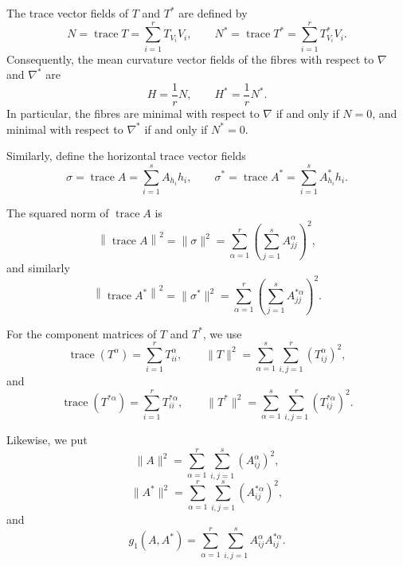 \documentclass[10pt,a4paper]{article}
\theoremstyle{definition}
\theoremstyle{remark}
\numberwithin{equation}{section}
\begin{document}
The trace vector fields of $T$ and $T^{*}$ are defined by
\begin{equation}
N=\operatorname{trace}T
=
\sum_{i=1}^{r}T_{V_i}V_i,
\qquad
N^{*}=\operatorname{trace}T^{*}
=
\sum_{i=1}^{r}T^{*}_{V_i}V_i.
\label{eq-trace-T}
\end{equation}
Consequently, the mean curvature vector fields of the fibres with respect
to $\nabla$ and $\nabla^{*}$ are
\begin{equation}
H=\frac{1}{r}N,
\qquad
H^{*}=\frac{1}{r}N^{*}.
\label{eq-mean-curvature}
\end{equation}
In particular, the fibres are minimal with respect to $\nabla$ if and
only if $N=0$, and minimal with respect to $\nabla^{*}$ if and only if
$N^{*}=0$.

Similarly, define the horizontal trace vector fields
\begin{equation}
\sigma
=
\operatorname{trace}A
=
\sum_{i=1}^{s}A_{h_i}h_i,
\qquad
\sigma^{*}
=
\operatorname{trace}A^{*}
=
\sum_{i=1}^{s}A^{*}_{h_i}h_i.
\label{eq-sigma}
\end{equation}

The squared norm of $\operatorname{trace}A$ is
\begin{equation}
\left\|\operatorname{trace}A\right\|^{2}
=
\|\sigma\|^{2}
=
\sum_{\alpha=1}^{r}
\left(
\sum_{j=1}^{s}A_{jj}^{\alpha}
\right)^{2},
\label{eq-nrm-A}
\end{equation}
and similarly
\begin{equation}
\left\|\operatorname{trace}A^{*}\right\|^{2}
=
\|\sigma^{*}\|^{2}
=
\sum_{\alpha=1}^{r}
\left(
\sum_{j=1}^{s}A_{jj}^{*\alpha}
\right)^{2}.
\label{eq-nrm-Astar}
\end{equation}

For the component matrices of $T$ and $T^{*}$, we use
\begin{equation}
\operatorname{trace}(T^{\alpha})
=
\sum_{i=1}^{r}T_{ii}^{\alpha},
\qquad
\|T\|^{2}
=
\sum_{\alpha=1}^{s}
\sum_{i,j=1}^{r}
(T_{ij}^{\alpha})^{2},
\label{eq-T-norm}
\end{equation}
and
\begin{equation}
\operatorname{trace}(T^{*\alpha})
=
\sum_{i=1}^{r}T_{ii}^{*\alpha},
\qquad
\|T^{*}\|^{2}
=
\sum_{\alpha=1}^{s}
\sum_{i,j=1}^{r}
(T_{ij}^{*\alpha})^{2}.
\label{eq-Tstar-norm}
\end{equation}

Likewise, we put
\begin{equation}
\|A\|^{2}
=
\sum_{\alpha=1}^{r}
\sum_{i,j=1}^{s}
(A_{ij}^{\alpha})^{2},
\label{eq-A-norm}
\end{equation}
\begin{equation}
\|A^{*}\|^{2}
=
\sum_{\alpha=1}^{r}
\sum_{i,j=1}^{s}
(A_{ij}^{*\alpha})^{2},
\label{eq-Astar-norm}
\end{equation}
and
\begin{equation}
g_1(A,A^{*})
=
\sum_{\alpha=1}^{r}
\sum_{i,j=1}^{s}
A_{ij}^{\alpha}A_{ij}^{*\alpha}.
\label{eq-A-Astar-inner}
\end{equation}
\end{document}
